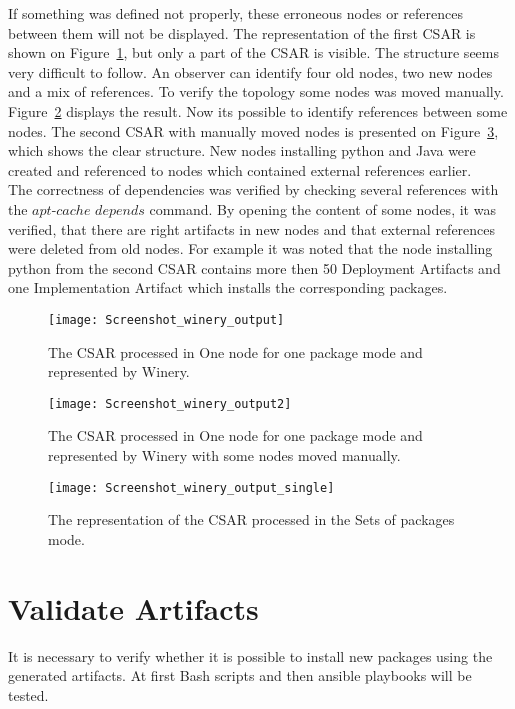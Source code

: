 If something was defined not properly, these erroneous nodes or references between them will not be displayed.
The representation of the first CSAR is shown on Figure~\ref{fig:winery_output}, but only a part of the CSAR is visible.
The structure seems very difficult to follow.
An observer can identify four old nodes, two new nodes and a mix of references.
 To verify the topology some nodes was moved manually. 
 Figure~\ref{fig:winery_output2} displays the result. 
 Now its possible to identify references between some nodes.
The second CSAR with manually moved nodes is presented on Figure~\ref{fig:winery_output_single}, which shows the clear structure.
New nodes installing python and Java were created and referenced to nodes which contained external references earlier.\\
 The correctness of dependencies was verified by checking several references with the $apt$-$cache$ $depends$ command.
By opening the content of some nodes, it was verified, that there are right artifacts in new nodes and that external references were deleted from old nodes.
For example it was noted that the node installing python from the second CSAR contains more then 50 Deployment Artifacts and one Implementation Artifact which installs the corresponding packages.
 \begin{figure}[ht]   
 	\centering
 	\texttt{[image: Screenshot\_winery\_output]}  
 	\caption{The CSAR processed in One node for one package mode and represented by Winery.}
 	\label{fig:winery_output}
 \end{figure}
 \begin{figure}[ht]   
 	\centering
 	\texttt{[image: Screenshot\_winery\_output2]}
 	\caption{The CSAR processed in One node for one package mode and represented by Winery with some nodes moved manually.}
 	\label{fig:winery_output2}
 \end{figure}
\begin{figure}[ht]   
	\centering
	\texttt{[image: Screenshot\_winery\_output\_single]}
	\caption{The representation of the CSAR processed in the Sets of packages mode.}
	\label{fig:winery_output_single}
\end{figure}
\section{Validate Artifacts}\label{sec:checkart}
It is necessary to verify whether it is possible to install new packages using the generated artifacts.
At first Bash scripts and then ansible playbooks will be tested.

